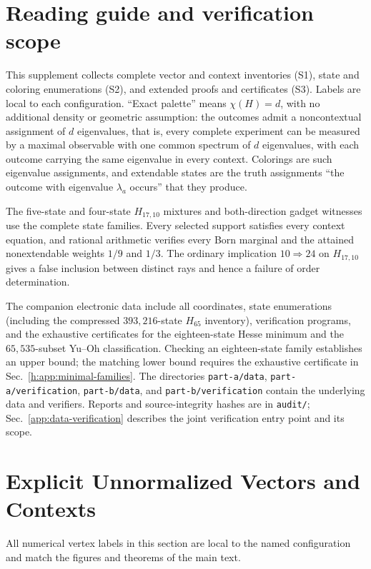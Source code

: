 \documentclass[aps,pra,reprint,superscriptaddress,longbibliography,nofootinbib,floatfix,10pt]{revtex4-2}
\theoremstyle{definition}
\begin{document}
\section*{Reading guide and verification scope}
This supplement collects complete vector and context inventories (S1), state and coloring enumerations (S2), and extended proofs and certificates (S3). Labels are local to each configuration. ``Exact palette'' means $\chi(H)=d$, with no additional density or geometric assumption: the outcomes admit a noncontextual assignment of $d$ eigenvalues, that is, every complete experiment can be measured by a maximal observable with one common spectrum of $d$ eigenvalues, with each outcome carrying the same eigenvalue in every context. Colorings are such eigenvalue assignments, and extendable states are the truth assignments ``the outcome with eigenvalue $\lambda_a$ occurs'' that they produce.

The five-state and four-state $H_{17,10}$ mixtures and both-direction gadget witnesses use the complete state families. Every selected support satisfies every context equation, and rational arithmetic verifies every Born marginal and the attained nonextendable weights $1/9$ and $1/3$. The ordinary implication $10\Rightarrow24$ on $H_{17,10}$ gives a false inclusion between distinct rays and hence a failure of order determination.

The companion electronic data include all coordinates, state enumerations (including the compressed $393{,}216$-state $H_{65}$ inventory), verification programs, and the exhaustive certificates for the eighteen-state Hesse minimum and the $65{,}535$-subset Yu--Oh classification. Checking an eighteen-state family establishes an upper bound; the matching lower bound requires the exhaustive certificate in Sec.~\ref{h:app:minimal-families}. The directories \texttt{part-a/data}, \texttt{part-a/verification}, \texttt{part-b/data}, and \texttt{part-b/verification} contain the underlying data and verifiers. Reports and source-integrity hashes are in \texttt{audit/}; Sec.~\ref{app:data-verification} describes the joint verification entry point and its scope.


\section{Explicit Unnormalized Vectors and Contexts}\label{app:all-vectors}\label{app:vectors}

All numerical vertex labels in this section are local to the named configuration and match the figures and theorems of the main text.
\end{document}
